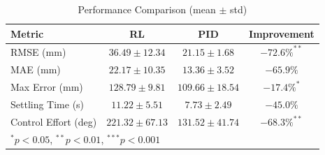 \begin{table}[h]
\centering
\caption{Performance Comparison (mean $\pm$ std)}
\label{tab:performance}
\begin{tabular}{lccc}
\hline
Metric & RL & PID & Improvement \\
\hline
RMSE (mm) & $36.49 \pm 12.34$ & $21.15 \pm 1.68$ & $-72.6\%^{**}$ \\
MAE (mm) & $22.17 \pm 10.35$ & $13.36 \pm 3.52$ & $-65.9\%$ \\
Max Error (mm) & $128.79 \pm 9.81$ & $109.66 \pm 18.54$ & $-17.4\%^{*}$ \\
Settling Time (s) & $11.22 \pm 5.51$ & $7.73 \pm 2.49$ & $-45.0\%$ \\
Control Effort (deg) & $221.32 \pm 67.13$ & $131.52 \pm 41.74$ & $-68.3\%^{**}$ \\
\hline
\multicolumn{4}{l}{\footnotesize $^{*}p<0.05$, $^{**}p<0.01$, $^{***}p<0.001$} \\
\end{tabular}
\end{table}